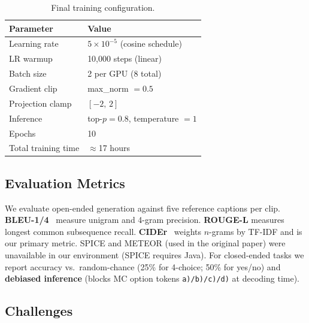 \documentclass[cameraready]{Interspeech}
\begin{document}
\begin{table}[h]
\centering
\caption{Final training configuration.}
\label{tab:config}
\begin{tabular}{ll}
\toprule
\textbf{Parameter} & \textbf{Value} \\
\midrule
Learning rate       & $5 \times 10^{-5}$ (cosine schedule) \\
LR warmup           & 10,000 steps (linear) \\
Batch size          & 2 per GPU (8 total) \\
Gradient clip       & max\_norm $= 0.5$ \\
Projection clamp    & $[-2,\, 2]$ \\
Inference           & top-$p = 0.8$, temperature $= 1$ \\
Epochs              & 10 \\
Total training time & $\approx$17 hours \\
\bottomrule
\end{tabular}
\end{table}

\subsection{Evaluation Metrics}

We evaluate open-ended generation against five reference captions per clip.
\textbf{BLEU-1/4}~\cite{papineni2002bleu} measure unigram and 4-gram precision.
\textbf{ROUGE-L} measures longest common subsequence recall. \textbf{CIDEr}~\cite{vedantam2015cider} weights $n$-grams by TF-IDF and is our primary metric. SPICE and METEOR (used in the original paper) were unavailable in our environment (SPICE requires Java). For closed-ended tasks we report accuracy vs.\ random-chance (25\% for 4-choice; 50\% for yes/no) and \textbf{debiased inference} (blocks MC option tokens \texttt{a)/b)/c)/d)} at decoding time).

\subsection{Challenges}
\end{document}
